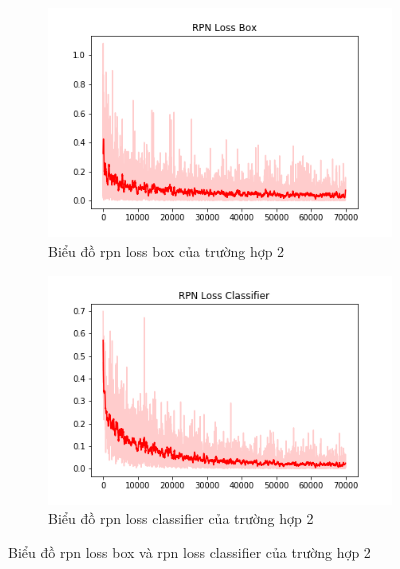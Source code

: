 \begin{center}
	\begin{figure}[H]
    \centering
    	\begin{subfigure}[H]{0.5\linewidth}
    		\centering
    		\includegraphics[width=\linewidth]{images/chap3/RPN_Loss_Box.png}
		    \caption{Biểu đồ rpn loss box của trường hợp 2}
		    \label{fig:my_label}
		\end{subfigure}\hfill
		\begin{subfigure}[H]{0.5\linewidth}
    		\centering
    		\includegraphics[width=\linewidth]{images/chap3/RPN_Loss_Classifier.png}
		    \caption{Biểu đồ rpn loss classifier của trường hợp 2}
		    \label{fig:my_label}
		\end{subfigure}\hfill
	\caption{Biểu đồ rpn loss box và rpn loss classifier của trường hợp 2}
    \label{fig:mylabel}
    \end{figure}
\end{center}


